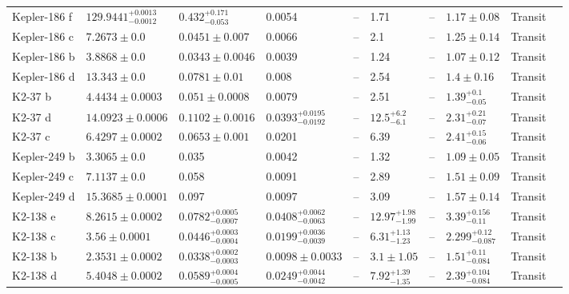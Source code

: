 \begin{tabular}{llllllllll}
Kepler-186 f & $129.9441^{+0.0013}_{-0.0012}$ & $0.432^{+0.171}_{-0.053}$ & 0.0054 & -- & 1.71 & -- & $1.17 \pm 0.08$ & Transit & \cite{TORRES_ET_AL__2015} \\
Kepler-186 c & $7.2673 \pm 0.0$ & $0.0451 \pm 0.007$ & 0.0066 & -- & 2.1 & -- & $1.25 \pm 0.14$ & Transit & \cite{QUINTANA_ET_AL__2014} \\
Kepler-186 b & $3.8868 \pm 0.0$ & $0.0343 \pm 0.0046$ & 0.0039 & -- & 1.24 & -- & $1.07 \pm 0.12$ & Transit & \cite{QUINTANA_ET_AL__2014} \\
Kepler-186 d & $13.343 \pm 0.0$ & $0.0781 \pm 0.01$ & 0.008 & -- & 2.54 & -- & $1.4 \pm 0.16$ & Transit & \cite{QUINTANA_ET_AL__2014} \\
K2-37 b & $4.4434 \pm 0.0003$ & $0.051 \pm 0.0008$ & 0.0079 & -- & 2.51 & -- & $1.39^{+0.1}_{-0.05}$ & Transit & \cite{HOWARD_ET_AL__2025} \\
K2-37 d & $14.0923 \pm 0.0006$ & $0.1102 \pm 0.0016$ & $0.0393^{+0.0195}_{-0.0192}$ & -- & $12.5^{+6.2}_{-6.1}$ & -- & $2.31^{+0.21}_{-0.07}$ & Transit & \cite{HOWARD_ET_AL__2025} \\
K2-37 c & $6.4297 \pm 0.0002$ & $0.0653 \pm 0.001$ & 0.0201 & -- & 6.39 & -- & $2.41^{+0.15}_{-0.06}$ & Transit & \cite{HOWARD_ET_AL__2025} \\
Kepler-249 b & $3.3065 \pm 0.0$ & 0.035 & 0.0042 & -- & 1.32 & -- & $1.09 \pm 0.05$ & Transit & \cite{ROWE_ET_AL__2014} \\
Kepler-249 c & $7.1137 \pm 0.0$ & 0.058 & 0.0091 & -- & 2.89 & -- & $1.51 \pm 0.09$ & Transit & \cite{ROWE_ET_AL__2014} \\
Kepler-249 d & $15.3685 \pm 0.0001$ & 0.097 & 0.0097 & -- & 3.09 & -- & $1.57 \pm 0.14$ & Transit & \cite{ROWE_ET_AL__2014} \\
K2-138 e & $8.2615 \pm 0.0002$ & $0.0782^{+0.0005}_{-0.0007}$ & $0.0408^{+0.0062}_{-0.0063}$ & -- & $12.97^{+1.98}_{-1.99}$ & -- & $3.39^{+0.156}_{-0.11}$ & Transit & \cite{LOPEZ_ET_AL__2019} \\
K2-138 c & $3.56 \pm 0.0001$ & $0.0446^{+0.0003}_{-0.0004}$ & $0.0199^{+0.0036}_{-0.0039}$ & -- & $6.31^{+1.13}_{-1.23}$ & -- & $2.299^{+0.12}_{-0.087}$ & Transit & \cite{LOPEZ_ET_AL__2019} \\
K2-138 b & $2.3531 \pm 0.0002$ & $0.0338^{+0.0002}_{-0.0003}$ & $0.0098 \pm 0.0033$ & -- & $3.1 \pm 1.05$ & -- & $1.51^{+0.11}_{-0.084}$ & Transit & \cite{LOPEZ_ET_AL__2019} \\
K2-138 d & $5.4048 \pm 0.0002$ & $0.0589^{+0.0004}_{-0.0005}$ & $0.0249^{+0.0044}_{-0.0042}$ & -- & $7.92^{+1.39}_{-1.35}$ & -- & $2.39^{+0.104}_{-0.084}$ & Transit & \cite{LOPEZ_ET_AL__2019} \\

\end{tabular}
